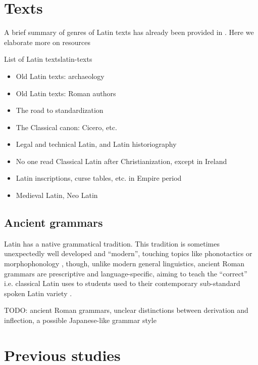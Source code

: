 \documentclass[a4paper, oneside, 12pt]{report}
\newcommand*{\citepage}[1]{p.~{#1}}
\newcommand*{\citepages}[1]{pp.~{#1}}
\begin{document}
\section{Texts}

A brief summary of genres of Latin texts has already been provided in .
Here we elaborate more on resources

\begin{todobox}{List of Latin texts}{latin-texts}
 \begin{itemize}
    \item Old Latin texts: archaeology
    \item Old Latin texts: Roman authors
    \item The road to standardization
    \item The Classical canon: Cicero, etc.
    \item Legal and technical Latin, and Latin historiography
    \item No one read Classical Latin after Christianization, except in Ireland
    \item Latin inscriptions, curse tables, etc. in Empire period
    \item Medieval Latin, Neo Latin
\end{itemize}
   
\end{todobox}

\subsection{Ancient grammars}

Latin has a native grammatical tradition.
This tradition is sometimes unexpectedly well developed and ``modern'', touching topics like phonotactics or morphophonology \citep[\citepage{28}]{matthews2019graeco}, though, unlike modern general linguistics, ancient Roman grammars are prescriptive and language-specific, aiming to teach the ``correct'' i.e. classical Latin uses to students used to their contemporary sub-standard spoken Latin variety \citep[\citepages{31-33}]{matthews2019graeco}.

\citep[\citepage{191}]{matthews2019graeco}

TODO: ancient Roman grammars, unclear distinctions between derivation and inflection, a possible Japanese-like grammar style

\section{Previous studies}
\end{document}
